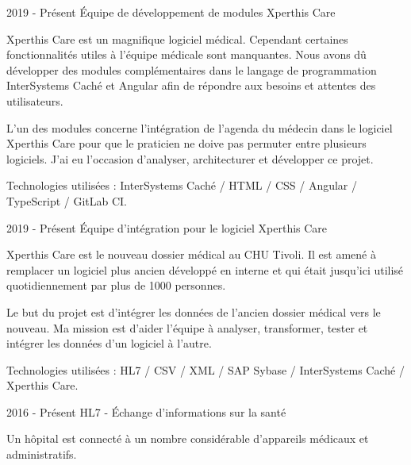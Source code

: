 

\begin{cventries}


    
  \cventry
    {2019 - Présent} %
    {Équipe de développement de modules Xperthis Care} %
    {} %
    {} %
    {
    Xperthis Care est un magnifique logiciel médical. Cependant certaines fonctionnalités utiles à l'équipe médicale sont manquantes.
    Nous avons dû développer des modules complémentaires dans le langage de programmation InterSystems Caché et Angular afin de répondre aux besoins et attentes des utilisateurs.

    L'un des modules concerne l'intégration de l'agenda du médecin dans le logiciel Xperthis Care pour que le praticien ne doive pas permuter entre plusieurs logiciels. J'ai eu l'occasion d'analyser, architecturer et développer ce projet.

    Technologies utilisées : InterSystems Caché / HTML / CSS / Angular / TypeScript / GitLab CI.

    }
    
    
  \cventry
    {2019 - Présent} %
    {Équipe d'intégration pour le logiciel Xperthis Care} %
    {} %
    {} %
    {
    Xperthis Care est le nouveau dossier médical au CHU Tivoli. Il est amené à remplacer un logiciel plus ancien développé en interne et qui était jusqu'ici utilisé quotidiennement par plus de 1000 personnes.
    
    Le but du projet est d'intégrer les données de l'ancien dossier médical vers le nouveau. Ma mission est d'aider l'équipe à analyser, transformer, tester et intégrer les données d'un logiciel à l'autre.

    Technologies utilisées : HL7 / CSV / XML / SAP Sybase / InterSystems Caché / Xperthis Care.

    }
    
  \cventry
    {2016 - Présent} %
    {HL7 - Échange d'informations sur la santé} %
    {} %
    {} %
    {
    Un hôpital est connecté à un nombre considérable d'appareils médicaux et administratifs. 
    
}
\end{cventries}
